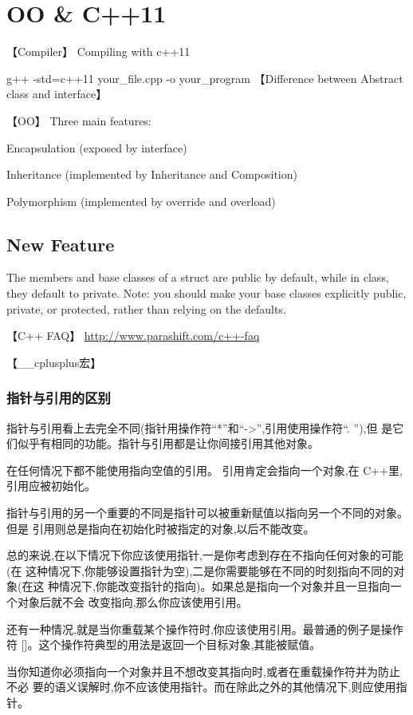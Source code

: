 \chapter{OO \& C++11}
【Compiler】 Compiling with c++11

g++ -std=c++11 your_file.cpp -o your_program
【Difference between Abstract class and interface】

【OO】 Three main features:
\begindot
\item Encapsulation (exposed by interface)
\item Inheritance (implemented by Inheritance and Composition)
\item Polymorphism (implemented by override and overload)
\myenddot

\section{New Feature}
The members and base classes of a struct are public by default, while in class, they default to private. Note: you should make your base classes explicitly public, private, or protected, rather than relying on the defaults.

【C++ FAQ】 \hyperref[C++ FAQ]{http://www.parashift.com/c++-faq}

【__cplusplus宏】

\subsection{指针与引用的区别}
指针与引用看上去完全不同(指针用操作符“*”和“->”,引用使用操作符“. ”),但 是它们似乎有相同的功能。指针与引用都是让你间接引用其他对象。

在任何情况下都不能使用指向空值的引用。 引用肯定会指向一个对象,在 C++里,引用应被初始化。

指针与引用的另一个重要的不同是指针可以被重新赋值以指向另一个不同的对象。但是 引用则总是指向在初始化时被指定的对象,以后不能改变。

总的来说,在以下情况下你应该使用指针,一是你考虑到存在不指向任何对象的可能(在 这种情况下,你能够设置指针为空),二是你需要能够在不同的时刻指向不同的对象(在这 种情况下,你能改变指针的指向)。如果总是指向一个对象并且一旦指向一个对象后就不会 改变指向,那么你应该使用引用。

还有一种情况,就是当你重载某个操作符时,你应该使用引用。最普通的例子是操作符 []。这个操作符典型的用法是返回一个目标对象,其能被赋值。

当你知道你必须指向一个对象并且不想改变其指向时,或者在重载操作符并为防止不必 要的语义误解时,你不应该使用指针。而在除此之外的其他情况下,则应使用指针。

